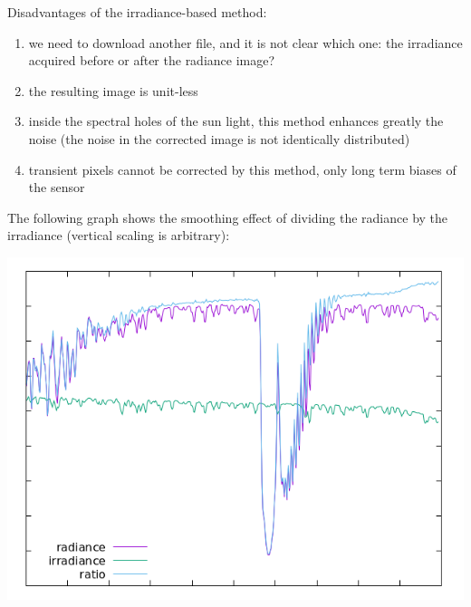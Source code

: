 \documentclass[a4paper]{article}    %
\theoremstyle{note}
\theoremstyle{plain}
\begin{document}
Disadvantages of the irradiance-based method:

\begin{enumerate}
	\item we need to download another file, and it is not clear which one: the
		irradiance acquired before or after the radiance image?
	\item the resulting image is unit-less
	\item inside the spectral holes of the sun light, this method enhances
		greatly the noise (the noise in the corrected image is not identically
		distributed)
	\item transient pixels cannot be corrected by this method, only long term
		biases of the sensor
\end{enumerate}

The following graph shows the smoothing effect of dividing the radiance by
the irradiance (vertical scaling is arbitrary):

\includegraphics[width=\linewidth]{f/pixelratio.png}
\end{document}
